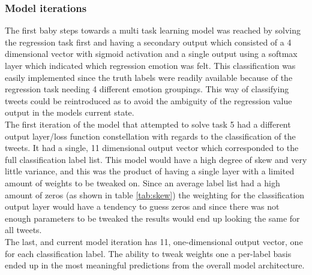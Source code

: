 \subsubsection{Model iterations} \label{sec:iter}
The first baby steps towards a multi task learning model was reached by solving the regression task first and having a secondary output which consisted of a 4 dimensional vector with sigmoid activation and a single output using a softmax layer which indicated which regression emotion was felt. This classification was easily implemented since the truth labels were readily available because of the regression task needing 4 different emotion groupings. This way of classifying tweets could be reintroduced as to avoid the ambiguity of the regression value output in the models current state.\\
The first iteration of the model that attempted to solve task 5 had a different output layer/loss function constellation with regards to the classification of the tweets. It had a single, 11 dimensional output vector which corresponded to the full classification label list. This model would have a high degree of skew and very little variance, and this was the product of having a single layer with a limited amount of weights to be tweaked on. Since an average label list had a high amount of zeros (as shown in table \ref{tab:skew}) the weighting for the classification output layer would have a tendency to guess zeros and since there was not enough parameters to be tweaked the results would end up looking the same for all tweets.\\
The last, and current model iteration has 11, one-dimensional output vector, one for each classification label. The ability to tweak weights one a per-label basis ended up in the most meaningful predictions from the overall model architecture.

